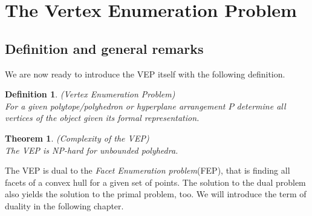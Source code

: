 \documentclass[a4paper, 11pt]{article}
\newtheorem{mydef}{Definition}
\newtheorem{theorem}{Theorem}
\begin{document}
\section{The Vertex Enumeration Problem}
\subsection{Definition and general remarks}
We are now ready to introduce the VEP itself with the following definition.
\begin{mydef}(Vertex Enumeration Problem)\\
	For a given polytope/polyhedron or hyperplane arrangement $P$ determine all vertices of the object given its formal representation. 
\end{mydef}

\begin{theorem}(Complexity of the VEP)\\
	The VEP is NP-hard for unbounded polyhedra.\cite{Khachiyan}
\end{theorem}


The VEP is dual to the \textit{Facet Enumeration problem}(FEP), that is finding all facets of a convex hull for a given set of points. The solution to the dual problem also yields the solution to the primal problem, too. We will introduce the term of duality in the following chapter.\\
\end{document}
